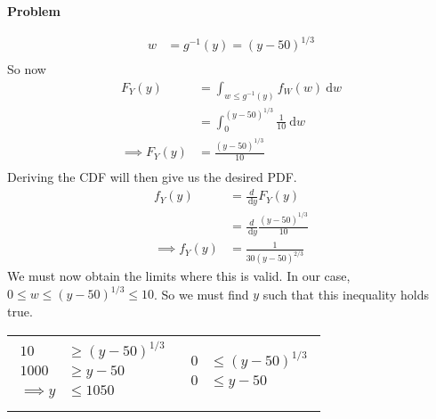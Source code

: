 \documentclass[12pt]{article}
\newenvironment{Ex}{\textbf{Problem}\vspace{.75em}\\}{}
\newcommand{\dd}[1]{\:\mathrm{d}{#1}}
\begin{document}
\begin{enumerate}
\begin{Ex}
\begin{solution}
\begin{enumerate}
\begin{equation}
\begin{aligned}
            w &= g^{-1}(y) = (y-50)^{1/3} \\
          \end{aligned}
        \end{equation}
        So now
        \begin{equation}
          \label{eq:4b-cdf}
          \begin{aligned}
            F_Y(y) &= \int_{w\le g^{-1}(y)} f_W(w) \dd{w} \\
            &= \int_{0}^{(y-50)^{1/3}} \frac{1}{10} \dd{w} \\
            \implies F_Y(y) &= \frac{(y-50)^{1/3}}{10} \\
          \end{aligned}
        \end{equation}
        Deriving the CDF will then give us the desired PDF.
        \begin{equation}
          \label{eq:4b-pdf}
          \begin{aligned}
            f_Y(y) &= \frac{d}{\dd{y}} F_Y(y) \\
            &= \frac{d}{\dd{y}} \frac{(y-50)^{1/3}}{10} \\
            \implies f_Y(y) &= \frac{1}{30 (y-50)^{2/3}}
          \end{aligned}
        \end{equation}
        We must now obtain the limits where this is valid. In our
        case, $0\le w \le (y-50)^{1/3} \le 10$. So we must find $y$
        such that this inequality holds true.
          \begin{table}[H]
            \centering
            \label{eq:4b-limits}
            \begin{tabularx}{\linewidth}{XX}
              \begin{equation}
                \begin{aligned}
                  10 &\ge(y-50)^{1/3} \\
                  1000 &\ge y-50 \\
                  \implies y &\le 1050 \\
                \end{aligned}
              \end{equation}
              &
              \begin{equation}
                \begin{aligned}
                  0 &\le (y-50)^{1/3} \\
                  0 &\le y-50 \\

\end{aligned}
\end{equation}
\end{tabularx}
\end{table}
\end{enumerate}
\end{solution}
\end{Ex}
\end{enumerate}
\end{document}
